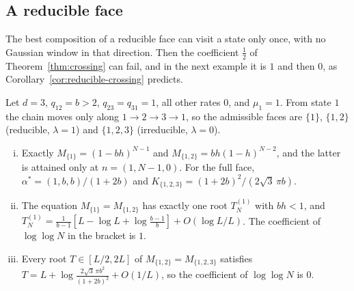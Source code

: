 \subsection{A reducible face}\label{sec:reducible}

The best composition of a reducible face can visit a state only once, with no
Gaussian window in that direction. Then the coefficient $\frac12$ of
Theorem~\ref{thm:crossing} can fail, and in the next example it is $1$ and then $0$, as
Corollary~\ref{cor:reducible-crossing} predicts.

\begin{example}\label{ex:threecycle}
Let $d=3$, $q_{12}=b>2$, $q_{23}=q_{31}=1$, all other rates $0$, and
$\mu_1=1$. From state $1$ the chain moves only along $1\to2\to3\to1$, so the
admissible faces are $\{1\}$, $\{1,2\}$ (reducible, $\lambda=1$) and
$\{1,2,3\}$ (irreducible, $\lambda=0$).
\begin{enumerate}[(i)]
\item Exactly $M_{\{1\}}=(1-bh)^{N-1}$ and $M_{\{1,2\}}=bh(1-h)^{N-2}$, and the latter is
attained only at $n=(1,N-1,0)$. For the full face,
$\alpha^*=(1,b,b)/(1+2b)$ and $K_{\{1,2,3\}}=(1+2b)^2/(2\sqrt3\,\pi b)$.
\item The equation $M_{\{1\}}=M_{\{1,2\}}$ has exactly one root $T^{(1)}_N$ with $bh<1$, and
$T^{(1)}_N=\frac1{b-1}[L-\log L+\log\frac{b-1}b]+O(\log L/L)$. The coefficient of
$\log\log N$ in the bracket is $1$.
\item Every root $T\in[L/2,2L]$ of $M_{\{1,2\}}=M_{\{1,2,3\}}$ satisfies
$T=L+\log\frac{2\sqrt3\,\pi b^2}{(1+2b)^2}+O(1/L)$, so the coefficient of
$\log\log N$ is $0$.
\end{enumerate}
\end{example}

